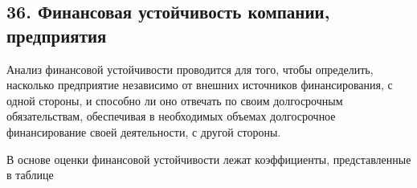 \subsection*{36. Финансовая устойчивость компании, предприятия}

Анализ финансовой устойчивости проводится для того, чтобы определить, насколько предприятие независимо от внешних источников финансирования, с одной стороны, и способно ли оно отвечать по своим долгосрочным обязательствам, обеспечивая в необходимых объемах долгосрочное финансирование своей деятельности, с другой стороны.

В основе оценки финансовой устойчивости лежат коэффициенты, представленные в таблице

	\small
	\label{my-label}
	\setlength{\extrarowheight}{1mm}

